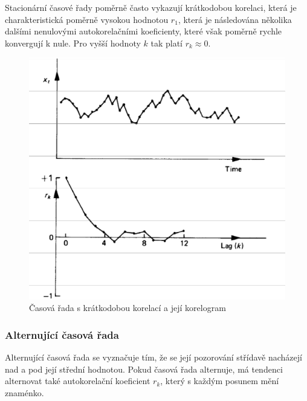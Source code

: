 Stacionární časové řady poměrně často vykazují krátkodobou korelaci, která je charakteristická poměrně vysokou hodnotou $r_1$, která je následována několika dalšími nenulovými autokorelačními koeficienty, které však poměrně rychle konvergují k nule. Pro vyšší hodnoty $k$ tak platí $r_k \approx 0$.

\begin{figure}[htp]
\centering
\includegraphics[scale = 0.40]{pictures/figure_2_1.eps}
\caption{Časová řada s krátkodobou korelací a její korelogram}
\label{figure_2_1}
\end{figure}

\subsubsection{Alternující časová řada}

Alternující časová řada se vyznačuje tím, že se její pozorování střídavě nacházejí nad a pod její střední hodnotou. Pokud časová řada alternuje, má tendenci alternovat také autokorelační koeficient $r_k$, který s každým posunem mění znaménko.

